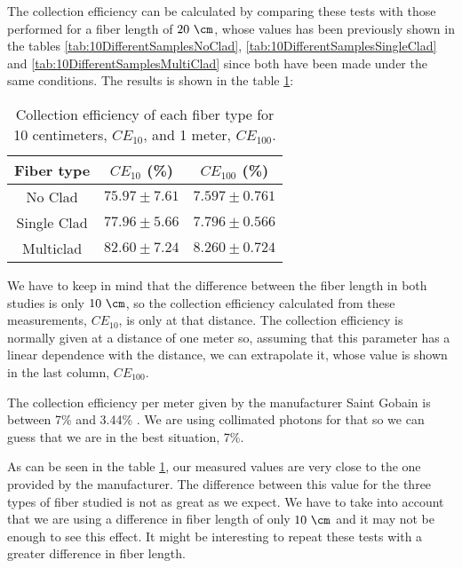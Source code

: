 The collection efficiency can be calculated by comparing these tests with those performed for a fiber length of $20~\cm$, whose values has been previously shown in the tables \ref{tab:10DifferentSamplesNoClad}, \ref{tab:10DifferentSamplesSingleClad} and \ref{tab:10DifferentSamplesMultiClad} since both have been made under the same conditions. The results is shown in the table \ref{tab:CollectionEfficiencyOfFibers}:



\begin{table}[htbp]
\begin{center}
\begin{tabular}{|c|c|c|}
\hline
Fiber type & $CE_{10}$ (\%) & $CE_{100}$ (\%) \\\hline \hline \hline
No Clad & $75.97 \pm 7.61$ & $7.597 \pm 0.761$ \\ \hline
Single Clad & $77.96 \pm 5.66$ & $7.796 \pm 0.566$ \\ \hline
Multiclad & $82.60 \pm 7.24$ & $8.260 \pm 0.724$ \\ \hline
\end{tabular}
\caption{Collection efficiency of each fiber type for 10 centimeters, $CE_{10}$, and 1 meter, $CE_{100}$.}
\label{tab:CollectionEfficiencyOfFibers}
\end{center}
\end{table}

We have to keep in mind that the difference between the fiber length in both studies is only $10~\cm$, so the collection efficiency calculated from these measurements, $CE_{10}$, is only at that distance. The collection efficiency is normally given at a distance of one meter so, assuming that this parameter has a linear dependence with the distance, we can extrapolate it, whose value is shown in the last column, $CE_{100}$.

The collection efficiency per meter given by the manufacturer Saint Gobain is between 7\% and 3.44\% \cite{DataSheetBCF12Fiber}. We are using collimated photons for that so we can guess that we are in the best situation, 7\%. 

As can be seen in the table \ref{tab:CollectionEfficiencyOfFibers}, our measured values are very close to the one provided by the manufacturer. The difference between this value for the three types of fiber studied is not as great as we expect. We have to take into account that we are using a difference in fiber length of only $10~\cm$ and it may not be enough to see this effect. It might be interesting to repeat these tests with a greater difference in fiber length.